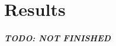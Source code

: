 \graphicspath{{results/fig/}}

\chapter{Results}
\label{chap:results}

\paragraph{TODO: NOT FINISHED}
